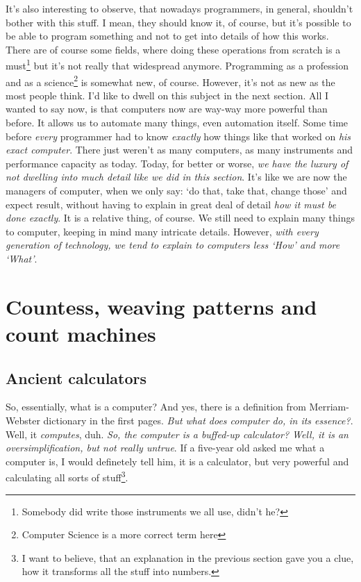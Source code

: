 \documentclass{report}
\begin{document}
            It's also interesting to observe, that nowadays programmers, in general, shouldn't bother with this stuff. I mean, they should know it, of course, but it's possible
            to be able to program something and not to get into details of how this works. There are of course some fields, where doing these operations from scratch 
            is a must\footnote{Somebody did write those instruments we all use, didn't he?} but it's not really that widespread anymore. Programming as a profession and as 
            a science\footnote{Computer Science is a more correct term here} is somewhat new, of course. However, it's not as new as the most people think. I'd like to dwell
            on this subject in the next section. All I wanted to say now, is that computers now are way-way more powerful than before. It allows us to automate many things, even
            automation itself. Some time before \emph{every} programmer had to know \emph{exactly} how things like that worked on \emph{his exact computer}. There just 
            weren't as many computers, as many instruments and performance capacity as today. Today, for better or worse, \emph{we have the luxury of not dwelling into much
            detail like we did in this section}. It's like we are now the managers of computer, when we only say: `do that, take that, change those' and expect result, without
            having to explain in great deal of detail \emph{how it must be done exactly}. It is a relative thing, of course. We still need to explain many things to computer,
            keeping in mind many intricate details. However, \emph{with every generation of technology, we tend to explain to computers less `How' and more `What'}.

            \newpage
        \section{Countess, weaving patterns and count machines}

            \subsection{Ancient calculators}

            So, essentially, what is a computer? And yes, there is a definition from Merriam-Webster dictionary in the first pages. \emph{But what does computer do, in its essence?}.
            Well, it \emph{computes}, duh. \emph{So, the computer is a buffed-up calculator? Well, it is an oversimplification, but not really untrue}. If a five-year old asked me
            what a computer is, I would definetely tell him, it is a calculator, but very powerful and calculating all sorts of stuff\footnote{I want to believe, that an explanation in 
            the previous section gave you a clue, how it transforms all the stuff into numbers.}. \par
\end{document}
